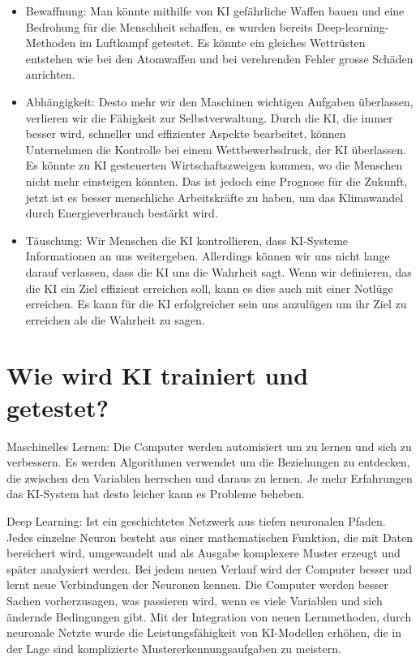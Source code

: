 \documentclass{report}
\begin{document}
\begin{itemize}
    \item Bewaffnung: Man könnte mithilfe von KI gefährliche Waffen bauen und eine Bedrohung für die Menschheit schaffen, es wurden bereits Deep-learning-Methoden im Luftkampf getestet. Es könnte ein gleiches Wettrüsten entstehen wie bei den Atomwaffen und bei verehrenden Fehler grosse Schäden anrichten.
    \item Abhängigkeit: Desto mehr wir den Maschinen wichtigen Aufgaben überlassen, verlieren wir die Fähigkeit zur Selbstverwaltung. Durch die KI, die immer besser wird, schneller und effizienter Aspekte bearbeitet, können Unternehmen die Kontrolle bei einem Wettbewerbsdruck, der KI überlassen. Es könnte zu KI gesteuerten Wirtschaftszweigen kommen, wo die Menschen nicht mehr einsteigen könnten. Das ist jedoch eine Prognose für die Zukunft, jetzt ist es besser menschliche Arbeitskräfte zu haben, um das Klimawandel durch Energieverbrauch bestärkt wird.
    \item Täuschung: Wir Menschen die KI kontrollieren, dass KI-Systeme Informationen an uns weitergeben. Allerdings können wir uns nicht lange darauf verlassen, dass die KI uns die Wahrheit sagt. Wenn wir definieren, das die KI ein Ziel effizient erreichen soll, kann es dies auch mit einer Notlüge erreichen. Es kann für die KI erfolgreicher sein uns anzulügen um ihr Ziel zu erreichen als die Wahrheit zu sagen. 
\end{itemize}




\section{Wie wird KI trainiert und getestet?}

Maschinelles Lernen:
Die Computer werden automisiert um zu lernen und sich zu verbessern. Es werden Algorithmen verwendet um die Beziehungen zu entdecken, die zwischen den Variablen herrschen und daraus zu lernen. Je mehr Erfahrungen das KI-System hat desto leicher kann es Probleme beheben.

Deep Learning:
Ist ein geschichtetes Netzwerk aus tiefen neuronalen Pfaden. Jedes einzelne Neuron besteht aus einer mathematischen Funktion, die mit Daten bereichert wird, umgewandelt und als Ausgabe komplexere Muster erzeugt und später analysiert werden.
Bei jedem neuen Verlauf wird der Computer besser und lernt neue Verbindungen der Neuronen kennen. Die Computer werden besser Sachen vorherzusagen, was passieren wird, wenn es viele Variablen und sich ändernde Bedingungen gibt. 
Mit der Integration von neuen Lernmethoden, durch neuronale Netzte wurde die Leistungsfähigkeit von KI-Modellen erhöhen, die in der Lage sind komplizierte Mustererkennungsaufgaben zu meistern.
\end{document}
